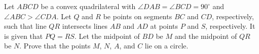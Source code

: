 Let $ABCD$ be a convex quadrilateral with $\angle{DAB}=\angle{BCD}=90^\circ$ and $\angle{ABC}>\angle{CDA}$. Let $Q$ and $R$ be points on segments $BC$ and $CD$, respectively, such that line $QR$ intersects lines $AB$ and $AD$ at points $P$ and $S$, respectively. It is given that $PQ=RS$. Let the midpoint of $BD$ be $M$ and the midpoint of $QR$ be $N$. Prove that the points $M$, $N$, $A$, and $C$ lie on a circle.
